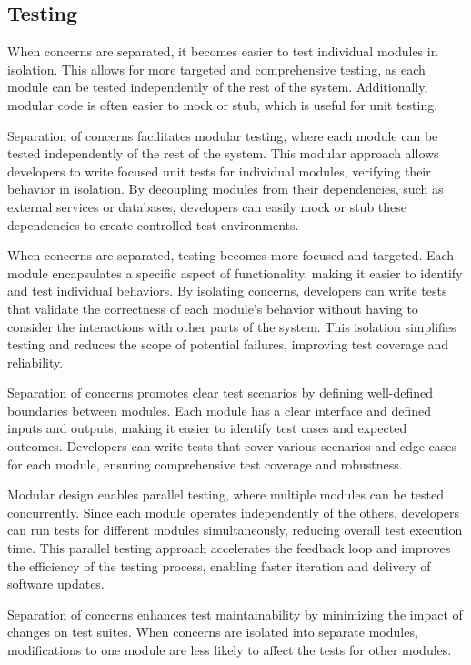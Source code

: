 \subsection{Testing} 
When concerns are separated, it becomes easier to test individual modules in isolation.
This allows for more targeted and comprehensive testing, as each module can be tested independently of the rest of the system.
Additionally, modular code is often easier to mock or stub, which is useful for unit testing.
\par
Separation of concerns facilitates modular testing, where each module can be tested independently of the rest of the system.
This modular approach allows developers to write focused unit tests for individual modules, verifying their behavior in isolation.
By decoupling modules from their dependencies, such as external services or databases, developers can easily mock or stub these dependencies to create controlled test environments.
\par
When concerns are separated, testing becomes more focused and targeted.
Each module encapsulates a specific aspect of functionality, making it easier to identify and test individual behaviors.
By isolating concerns, developers can write tests that validate the correctness of each module's behavior without having to consider the interactions with other parts of the system.
This isolation simplifies testing and reduces the scope of potential failures, improving test coverage and reliability.
\par
Separation of concerns promotes clear test scenarios by defining well-defined boundaries between modules.
Each module has a clear interface and defined inputs and outputs, making it easier to identify test cases and expected outcomes.
Developers can write tests that cover various scenarios and edge cases for each module, ensuring comprehensive test coverage and robustness.
\par
Modular design enables parallel testing, where multiple modules can be tested concurrently.
Since each module operates independently of the others, developers can run tests for different modules simultaneously, reducing overall test execution time.
This parallel testing approach accelerates the feedback loop and improves the efficiency of the testing process, enabling faster iteration and delivery of software updates.
 \par
Separation of concerns enhances test maintainability by minimizing the impact of changes on test suites.
When concerns are isolated into separate modules, modifications to one module are less likely to affect the tests for other modules.
